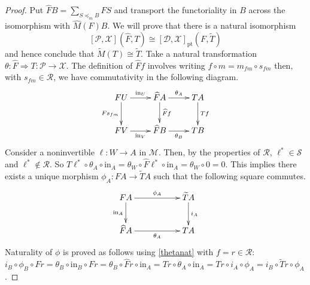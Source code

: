 \documentclass[a4paper,12pt,reqno]{amsart}
\theoremstyle{definition}
\theoremstyle{fact}
\theoremstyle{genquest}
\theoremstyle{step}
\newcommand{\dd}{\colon}
\newcommand{\lra}{\longrightarrow}
\newcommand{\ra}{\rightarrow}
\def\CD{{\mathscr D}}
\def\CM{{\mathscr M}}
\def\CP{{\mathscr P}}
\def\CR{{\mathscr R}}
\def\CS{{\mathscr S}}
\def\CX{{\mathscr X}}
\begin{document}
\begin{proof}
Put $\widehat{F}B = \sum_{S\preceq_m B}{FS}$ and transport the functoriality in $B$
across the isomorphism with $\widehat{M}(F)B$.
We will prove that there is a natural isomorphism
$$[\CP,\CX](\widehat{F}, T) \cong [\CD,\CX]_{\mathrm{pt}}(F,\widetilde{T})$$
and hence conclude that $\widetilde{M}(T) \cong \widetilde{T}$.
Take a natural transformation $\theta \dd \widehat{F}\Rightarrow T \dd \CP \ra \CX$. 
The definition of $\widehat{F}f$ involves writing $f\circ m = m_{fm} \circ s_{fm}$ then, 
with $s_{fm}\in \CR$, we have commutativity in the following diagram. 
\begin{equation}\label{thetanat}
\begin{aligned}
\xymatrix{
FU \ar[r]^-{\mathrm{in}_U} \ar[d]_-{Fs_{fm}} & \widehat{F}A \ar[d]^-{\widehat{F}f} \ar[r]^-{\theta_A} & TA \ar[d]^-{Tf}\\
FV \ar[r]_-{\mathrm{in}_V} & \widehat{F}B \ar[r]_-{\theta_B} & TB}
\end{aligned}
\end{equation}
Consider a noninvertible $\ell : W \ra A$ in $\CM$. 
Then, by the properties of $\CR$, $\ell^* \in \CS$ and $\ell^* \notin \CR$.
So $T\ell^*\circ \theta_A \circ \mathrm{in}_{A} = \theta_W \circ \widehat{F}\ell^*\circ \mathrm{in}_{A} = \theta_W \circ 0 = 0$. This implies there exists a unique morphism $\phi_A : FA \lra \widetilde{T}A$ 
such that the following square commutes.
\begin{equation}\label{defphi}
\begin{aligned}
\xymatrix{
FA \ar[rr]^-{\phi_A} \ar[d]_-{\mathrm{in}_A} && \widetilde{T}A \ar[d]^-{i_A} \\
\widehat{F}A \ar[rr]_-{\theta_A} && TA}
\end{aligned}
\end{equation}
Naturality of $\phi$ is proved as follows using \eqref{thetanat} with $f=r \in \CR$:
$i_B\circ \phi_B\circ Fr = \theta_B \circ \mathrm{in}_{B} \circ Fr = \theta_B \circ \widehat{F}r \circ \mathrm{in}_{A} = Tr \circ \theta_A \circ \mathrm{in}_{A} = Tr \circ i_A \circ \phi_A = i_B\circ \widetilde{T}r\circ \phi_A $. 


\end{proof}
\end{document}
